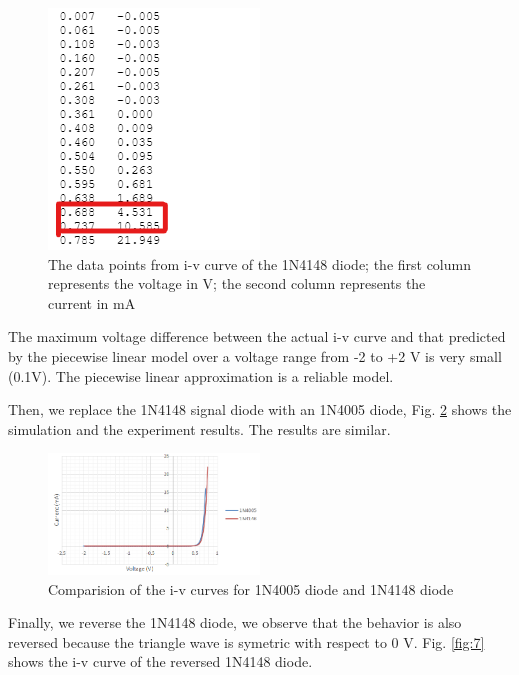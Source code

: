 \documentclass[letterpaper, 10 pt, conference]{ieeeconf}  %
\begin{document}
	\begin{figure}[h]
        \centering
        \includegraphics[width=0.5\textwidth]{images/result4.png}
        \caption{The data points from i-v curve of the 1N4148 diode; the first column represents the voltage in V; the second column represents the current in mA}
		\label{fig:5}
    \end{figure}
\par The maximum voltage difference between the actual i-v curve and that predicted by the piecewise linear model over a voltage range from -2 to +2 V is very small (0.1V). The piecewise linear approximation is a reliable model.
\par Then, we replace the 1N4148 signal diode with an 1N4005 diode, Fig. \ref{fig:6} shows the simulation and the experiment results. The results are similar.
	\begin{figure}[h]
        \centering
        \includegraphics[width=0.5\textwidth]{images/result5.png}
        \caption{Comparision of the i-v curves for 1N4005 diode and 1N4148 diode}
		\label{fig:6}
    \end{figure}
\par Finally, we reverse the 1N4148 diode, we observe that the behavior is also reversed because the triangle wave is symetric with respect to 0 V. Fig. \ref{fig:7} shows the i-v curve of the reversed 1N4148 diode.
\end{document}
